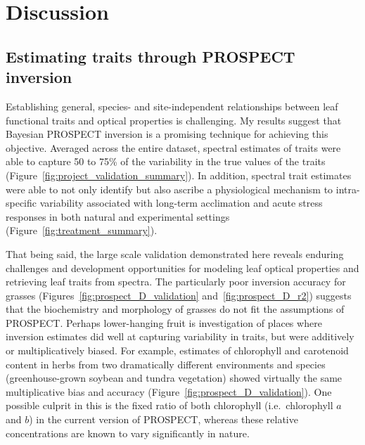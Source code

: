 \section{Discussion}

\subsection{Estimating traits through PROSPECT inversion}

Establishing general, species- and site-independent relationships between leaf functional traits and optical properties is challenging.
My results suggest that Bayesian PROSPECT inversion is a promising technique for achieving this objective.
Averaged across the entire dataset, spectral estimates of traits were able to capture 50 to 75\% of the variability in the true values of the traits (Figure~\ref{fig:project_validation_summary}).
In addition, spectral trait estimates were able to not only identify but also ascribe a physiological mechanism to intra-specific variability associated with long-term acclimation and acute stress responses in both natural and experimental settings (Figure~\ref{fig:treatment_summary}).

That being said, the large scale validation demonstrated here reveals enduring challenges and development opportunities for modeling leaf optical properties and retrieving leaf traits from spectra.
The particularly poor inversion accuracy for grasses (Figures~\ref{fig:prospect_D_validation} and~\ref{fig:prospect_D_r2}) suggests that the biochemistry and morphology of grasses do not fit the assumptions of PROSPECT\@.
Perhaps lower-hanging fruit is investigation of places where inversion estimates did well at capturing variability in traits, but were additively or multiplicatively biased.
For example, estimates of chlorophyll and carotenoid content in herbs from two dramatically different environments and species (greenhouse-grown soybean and tundra vegetation) showed virtually the same multiplicative bias and accuracy (Figure~\ref{fig:prospect_D_validation}).
One possible culprit in this is the fixed ratio of both chlorophyll (i.e.\ chlorophyll $a$ and $b$) in the current version of PROSPECT, whereas these relative concentrations are known to vary significantly in nature.
 
